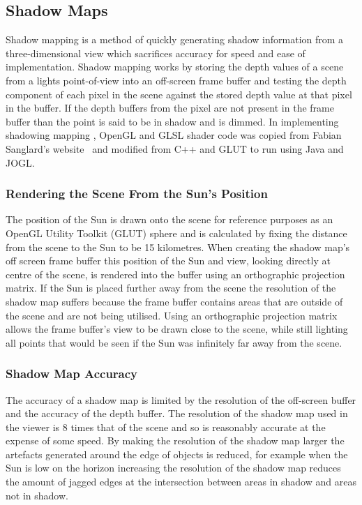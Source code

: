 \documentclass[12pt]{report}
\newcommand{\note}[1]{}
\newcommand{\notedme}[1]{}
\begin{document}
\subsection{Shadow Maps}
Shadow mapping is a method of quickly generating shadow information from a three-dimensional view which sacrifices accuracy for speed and ease of implementation. Shadow mapping works by storing the depth values of a scene from a lights point-of-view into an off-screen frame buffer and testing the depth component of each pixel in the scene against the stored depth value at that pixel in the buffer. If the depth buffers from the pixel are not present in the frame buffer than the point is said to be in shadow and is dimmed. In implementing shadowing mapping , OpenGL and GLSL shader code was copied from Fabian Sanglard's website~\cite{shadowb} and modified from C++ and GLUT to run using Java and JOGL.

\subsubsection{Rendering the Scene From the Sun's Position}
The position of the Sun is drawn onto the scene for reference purposes as an OpenGL Utility Toolkit (GLUT) sphere and is calculated by fixing the distance from the scene to the Sun to be 15 kilometres. When creating the shadow map's off screen frame buffer this position of the Sun and view, looking directly at centre of the scene, is rendered into the buffer using an orthographic projection matrix. If the Sun is placed further away from the scene the resolution of the shadow map suffers because the frame buffer contains areas that are outside of the scene and are not being utilised. Using an orthographic projection matrix allows the frame buffer's view to be drawn close to the scene, while still lighting all points that would be seen if the Sun was infinitely far away from the scene.

\subsubsection{Shadow Map Accuracy}
The accuracy of a shadow map is limited by the resolution of the off-screen buffer and the accuracy of the depth buffer. The resolution of the shadow map used in the viewer is 8 times that of the scene and so is reasonably accurate at the expense of some speed. By making the resolution of the shadow map larger the artefacts\note{I think this is the correct spelling of artefact for British English countries. According to wikipedia artifact is a minor variant preferred in North America. According to wiktionary artefact is preferred ``for a false signal in data caused by the processing''. What do you think?}\notedme{I like artefact, but don't really mind. There are some glitches on the figures that I don't think you discuss (near the mountain peaks?). Might be good to mention them.} generated around the edge of objects is reduced, for example when the Sun is low on the horizon increasing the resolution of the shadow map reduces the amount of jagged edges at the intersection between areas in shadow and areas not in shadow. 
\end{document}
